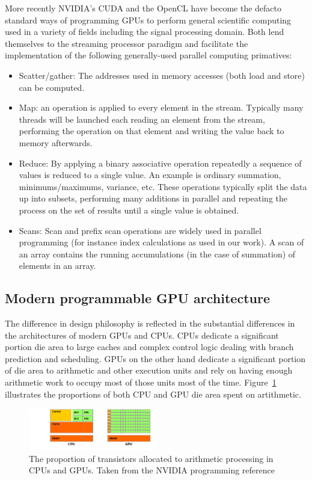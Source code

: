 More recently NVIDIA's CUDA \cite{cuda} and the OpenCL \cite{opencl} have become the defacto standard ways of 
programming GPUs to perform general scientific computing used in a variety of fields including the signal 
processing domain. Both lend themselves to the streaming processor paradigm and facilitate the implementation
of the following generally-used parallel computing primatives:
\begin{itemize}
 \item Scatter/gather: The addresses used in memory accesses (both load and store) can be computed.
 \item Map: an operation is applied to every element in the stream. Typically many threads will be launched
       each reading an element from the stream, performing the operation on that element and writing the value
       back to memory afterwards.
 \item Reduce: By applying a binary associative operation repeatedly a sequence of values is reduced to a single value.
       An example is ordinary summation, minimums/maximums, variance, etc. These operations typically split the data up into
       subsets, performing many additions in parallel and repeating the process on the set of results until a single value is
       obtained. 
 \item Scans: Scan and prefix scan operations are widely used in parallel programming (for instance index calculations as used
       in our work). A scan of an array contains the running accumulations (in the case of summation) of elements in an array. 
\end{itemize}

\subsection{Modern programmable GPU architecture}
The difference in design philosophy is reflected in the substantial differences in the architectures of modern GPUs and CPUs. CPUs dedicate a significant portion die area to large caches and complex control logic dealing with
branch prediction and scheduling. GPUs on the other hand dedicate a significant portion of die area to arithmetic and other execution units and rely on having enough arithmetic work to occupy most of those units most of the time.
Figure~\ref{fig_cpu_gpu_diff} illustrates the proportions of both CPU and GPU die area spent on artithmetic.
\begin{figure}[ht!]
 \begin{mdframed}
  \centering
  \includegraphics[width=0.5\textwidth]{images/gpu-devotes-more-transistors-to-data-processing.png}
  \caption[CPU vs. GPU architecture]{The proportion of transistors allocated to arithmetic processing in CPUs and GPUs. Taken from the NVIDIA programming reference \cite{cuda}}
  \label{fig_cpu_gpu_diff}
 \end{mdframed}
\end{figure}

